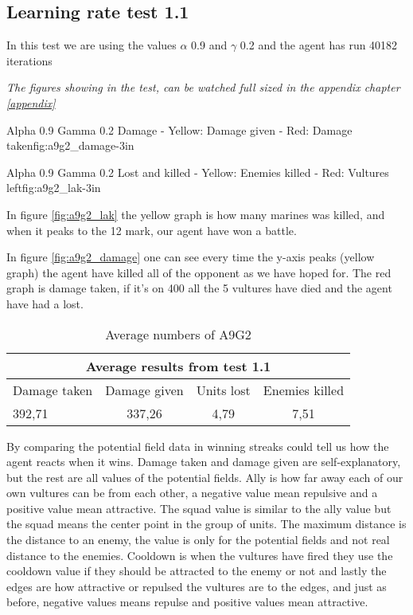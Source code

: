 \subsection*{Learning rate test 1.1}
In this test we are using the values $\alpha$ 0.9 and $\gamma$ 0.2 and the agent has run 40182 iterations


\textit{The figures showing in the test, can be watched full sized in the appendix chapter \ref{appendix}} 

			{Alpha 0.9 Gamma 0.2 Damage - Yellow: Damage given - Red: Damage taken}{fig:a9g2_damage}{-3in}

			{Alpha 0.9 Gamma 0.2 Lost and killed - Yellow: Enemies killed - Red: Vultures left}{fig:a9g2_lak}{-3in}
			
			
In figure \ref{fig:a9g2_lak} the yellow graph is how many marines was killed, and when it peaks to the 12 mark, our agent have won a battle.




In figure \ref{fig:a9g2_damage} one can see every time the y-axis peaks (yellow graph) the agent have killed all of the opponent as we have hoped for. The red graph is damage taken, if it's on 400 all the 5 vultures have died and the agent have had a lost.

\begin{centering}
\begin{table}
 \begin{tabular}{|l|c|c|c|}
	\multicolumn{4}{c}{Average results from test 1.1} \\
	\hline
		Damage taken & Damage given & Units lost & Enemies killed\\
	\hline
		392,71 & 337,26 & 4,79 & 7,51 \\
	\hline
\end{tabular}
\caption{Average numbers of A9G2}
\label{test1.1}
\end{table}
\end{centering}
\newpage
By comparing the potential field data in winning streaks could tell us how the agent reacts when it wins. Damage taken and damage given are self-explanatory, but the rest are all values of the potential fields. Ally is how far away each of our own vultures can be from each other, a negative value mean repulsive and a positive value mean attractive. The squad value is similar to the ally value but the squad means the center point in the group of units. The maximum distance is the distance to an enemy, the value is only for the potential fields and not real distance to the enemies. Cooldown is when the vultures have fired they use the cooldown value if they should be attracted to the enemy or not and lastly the edges are how attractive or repulsed the vultures are to the edges, and just as before, negative values means repulse and positive values mean attractive. 
\newpage
